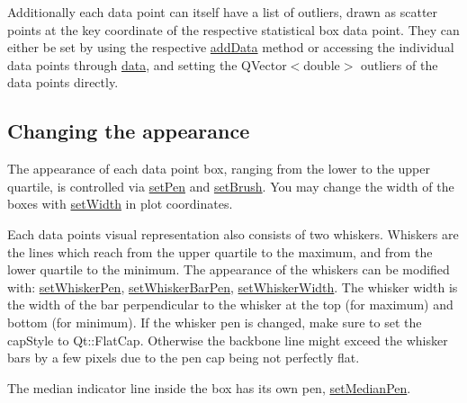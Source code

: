 Additionally each data point can itself have a list of outliers, drawn as scatter points at the key coordinate of the respective statistical box data point. They can either be set by using the respective \hyperlink{class_q_c_p_statistical_box_a026f2790b530d6f29312254ecb1e7c1e}{add\+Data} method or accessing the individual data points through \hyperlink{class_q_c_p_statistical_box_a728e501413eaf191544014173d52dfbc}{data}, and setting the {\ttfamily Q\+Vector$<$double$>$ outliers} of the data points directly.\hypertarget{class_q_c_p_statistical_box_qcpstatisticalbox-appearance}{}\subsection{Changing the appearance}\label{class_q_c_p_statistical_box_qcpstatisticalbox-appearance}
The appearance of each data point box, ranging from the lower to the upper quartile, is controlled via \hyperlink{class_q_c_p_abstract_plottable_ab74b09ae4c0e7e13142fe4b5bf46cac7}{set\+Pen} and \hyperlink{class_q_c_p_abstract_plottable_a7a4b92144dca6453a1f0f210e27edc74}{set\+Brush}. You may change the width of the boxes with \hyperlink{class_q_c_p_statistical_box_a0b62775bd67301b1eba5c785f2b26f14}{set\+Width} in plot coordinates.

Each data point\textquotesingle{}s visual representation also consists of two whiskers. Whiskers are the lines which reach from the upper quartile to the maximum, and from the lower quartile to the minimum. The appearance of the whiskers can be modified with\+: \hyperlink{class_q_c_p_statistical_box_a4a5034cb3b9b040444df05ab1684620b}{set\+Whisker\+Pen}, \hyperlink{class_q_c_p_statistical_box_aa8d3e503897788e1abf68dc74b5f147f}{set\+Whisker\+Bar\+Pen}, \hyperlink{class_q_c_p_statistical_box_adf378812446bd66f34d1f7f293d991cd}{set\+Whisker\+Width}. The whisker width is the width of the bar perpendicular to the whisker at the top (for maximum) and bottom (for minimum). If the whisker pen is changed, make sure to set the {\ttfamily cap\+Style} to {\ttfamily Qt\+::\+Flat\+Cap}. Otherwise the backbone line might exceed the whisker bars by a few pixels due to the pen cap being not perfectly flat.

The median indicator line inside the box has its own pen, \hyperlink{class_q_c_p_statistical_box_a7260ac55b669f5d0a74f16d5ca84c52c}{set\+Median\+Pen}.

